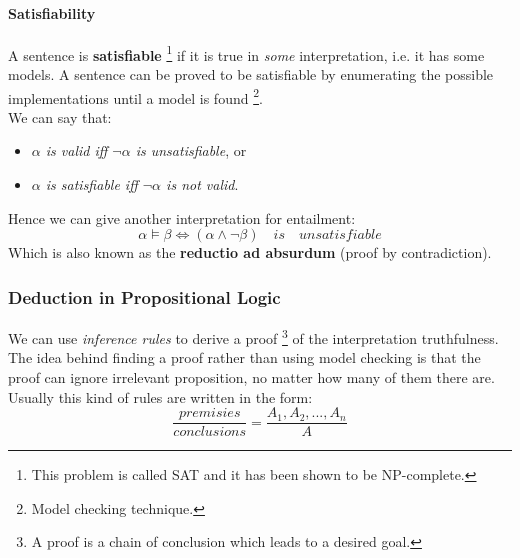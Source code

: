 \documentclass[10pt,a4paper]{article}
\begin{document}
\paragraph{Satisfiability} A sentence is \textbf{satisfiable} \footnote{This problem is called SAT and it has been shown to be NP-complete.} if it is true in \textit{some} interpretation, i.e. it has some models. A sentence can be proved to be satisfiable by enumerating the possible implementations until a model is found \footnote{Model checking technique.}.\\
We can say that:
\begin{itemize}
\item \textit{$\alpha$ is valid iff $\neg \alpha$ is unsatisfiable}, or
\item \textit{$\alpha$ is satisfiable iff $\neg \alpha$ is not valid}.
\end{itemize}
Hence we can give another interpretation for entailment:
\[\alpha \models \beta \Longleftrightarrow (\alpha \wedge \neg \beta)\quad is \quad unsatisfiable\]
Which is also known as the \textbf{reductio ad absurdum} (proof by contradiction).

\subsubsection{Deduction in Propositional Logic}
\label{subsubsec:deduction}
We can use \textit{inference rules} to derive a proof \footnote{A proof is a chain of conclusion which leads to a desired goal.} of the interpretation truthfulness.
The idea behind finding a proof rather than using model checking is that the proof can ignore irrelevant proposition, no matter how many of them there are.\\
Usually this kind of rules are written in the form:
\[\frac{premisies}{conclusions}=\frac{A_1,A_2,...,A_n}{A}\]
\end{document}
